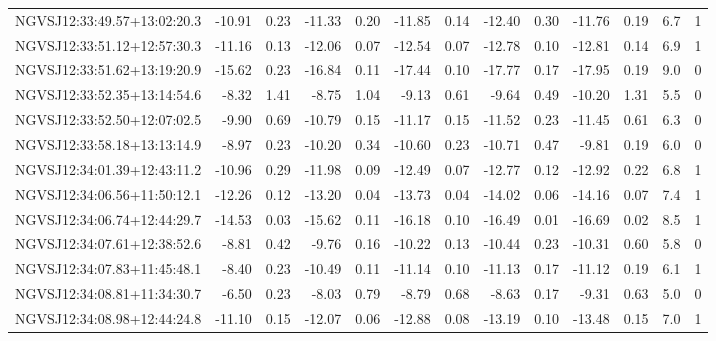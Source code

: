 \begin{tabular}{lrrrrrrrrrrcc}
NGVSJ12:33:49.57+13:02:20.3 & -10.91 & 0.23 & -11.33 & 0.20 & -11.85 & 0.14 & -12.40 & 0.30 & -11.76 & 0.19 & 6.7 & 1 \\
NGVSJ12:33:51.12+12:57:30.3 & -11.16 & 0.13 & -12.06 & 0.07 & -12.54 & 0.07 & -12.78 & 0.10 & -12.81 & 0.14 & 6.9 & 1 \\
NGVSJ12:33:51.62+13:19:20.9 & -15.62 & 0.23 & -16.84 & 0.11 & -17.44 & 0.10 & -17.77 & 0.17 & -17.95 & 0.19 & 9.0 & 0 \\
NGVSJ12:33:52.35+13:14:54.6 & -8.32 & 1.41 & -8.75 & 1.04 & -9.13 & 0.61 & -9.64 & 0.49 & -10.20 & 1.31 & 5.5 & 0 \\
NGVSJ12:33:52.50+12:07:02.5 & -9.90 & 0.69 & -10.79 & 0.15 & -11.17 & 0.15 & -11.52 & 0.23 & -11.45 & 0.61 & 6.3 & 0 \\
NGVSJ12:33:58.18+13:13:14.9 & -8.97 & 0.23 & -10.20 & 0.34 & -10.60 & 0.23 & -10.71 & 0.47 & -9.81 & 0.19 & 6.0 & 0 \\
NGVSJ12:34:01.39+12:43:11.2 & -10.96 & 0.29 & -11.98 & 0.09 & -12.49 & 0.07 & -12.77 & 0.12 & -12.92 & 0.22 & 6.8 & 1 \\
NGVSJ12:34:06.56+11:50:12.1 & -12.26 & 0.12 & -13.20 & 0.04 & -13.73 & 0.04 & -14.02 & 0.06 & -14.16 & 0.07 & 7.4 & 1 \\
NGVSJ12:34:06.74+12:44:29.7 & -14.53 & 0.03 & -15.62 & 0.11 & -16.18 & 0.10 & -16.49 & 0.01 & -16.69 & 0.02 & 8.5 & 1 \\
NGVSJ12:34:07.61+12:38:52.6 & -8.81 & 0.42 & -9.76 & 0.16 & -10.22 & 0.13 & -10.44 & 0.23 & -10.31 & 0.60 & 5.8 & 0 \\
NGVSJ12:34:07.83+11:45:48.1 & -8.40 & 0.23 & -10.49 & 0.11 & -11.14 & 0.10 & -11.13 & 0.17 & -11.12 & 0.19 & 6.1 & 1 \\
NGVSJ12:34:08.81+11:34:30.7 & -6.50 & 0.23 & -8.03 & 0.79 & -8.79 & 0.68 & -8.63 & 0.17 & -9.31 & 0.63 & 5.0 & 0 \\
NGVSJ12:34:08.98+12:44:24.8 & -11.10 & 0.15 & -12.07 & 0.06 & -12.88 & 0.08 & -13.19 & 0.10 & -13.48 & 0.15 & 7.0 & 1 \\
\end{tabular}
